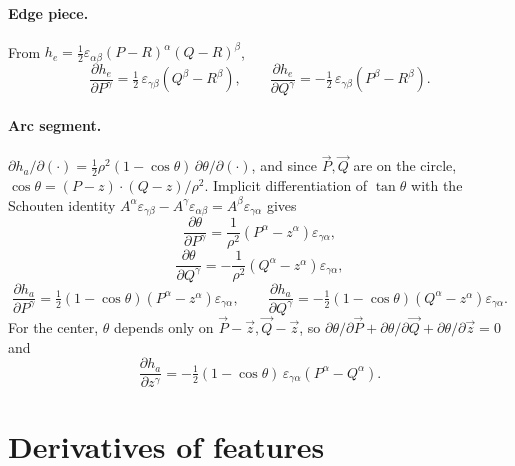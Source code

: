 \documentclass[11pt]{article}
\numberwithin{equation}{section}
\newcommand{\vv}[1]{\vec{#1}}
\newcommand{\half}{\tfrac{1}{2}}
\begin{document}
\paragraph{Edge piece.} From $h_e=\half\varepsilon_{\alpha\beta}(P-R)^{\alpha}(Q-R)^{\beta}$,
\begin{equation}
  \frac{\partial h_e}{\partial P^{\gamma}}=\half\,\varepsilon_{\gamma\beta}(Q^{\beta}-R^{\beta}),
  \qquad
  \frac{\partial h_e}{\partial Q^{\gamma}}=-\half\,\varepsilon_{\gamma\beta}(P^{\beta}-R^{\beta}).
\end{equation}

\paragraph{Arc segment.} $\partial h_a/\partial(\cdot)=\half\rho^2(1-\cos\theta)\,\partial\theta/\partial(\cdot)$,
and since $\vv P,\vv Q$ are on the circle, $\cos\theta=(P-z)\!\cdot\!(Q-z)/\rho^2$. Implicit
differentiation of $\tan\theta$ with the Schouten identity $A^{\alpha}\varepsilon_{\gamma\beta}-A^{\gamma}\varepsilon_{\alpha\beta}=A^{\beta}\varepsilon_{\gamma\alpha}$ gives
\begin{equation}
  \frac{\partial\theta}{\partial P^{\gamma}}=\frac{1}{\rho^2}(P^{\alpha}-z^{\alpha})\varepsilon_{\gamma\alpha},
\end{equation}
\begin{equation}
  \frac{\partial\theta}{\partial Q^{\gamma}}=-\frac{1}{\rho^2}(Q^{\alpha}-z^{\alpha})\varepsilon_{\gamma\alpha},
\end{equation}
\begin{equation}
  \frac{\partial h_a}{\partial P^{\gamma}}=\half(1-\cos\theta)(P^{\alpha}-z^{\alpha})\varepsilon_{\gamma\alpha},
  \qquad
  \frac{\partial h_a}{\partial Q^{\gamma}}=-\half(1-\cos\theta)(Q^{\alpha}-z^{\alpha})\varepsilon_{\gamma\alpha}.
\end{equation}
For the center, $\theta$ depends only on $\vv P-\vv z,\vv Q-\vv z$, so
$\partial\theta/\partial\vv P+\partial\theta/\partial\vv Q+\partial\theta/\partial\vv z=0$ and
\begin{equation}
  \frac{\partial h_a}{\partial z^{\gamma}}=-\half(1-\cos\theta)\,\varepsilon_{\gamma\alpha}(P^{\alpha}-Q^{\alpha}).
\end{equation}

\section{Derivatives of features}
\end{document}
